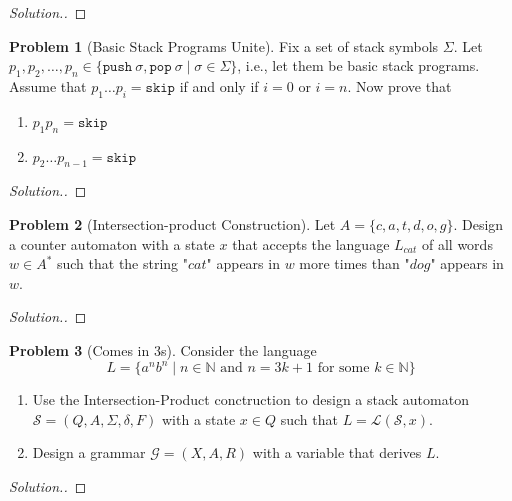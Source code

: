 \documentclass[11pt]{article}
\theoremstyle{theorem} %
\theoremstyle{definition} %
\newtheorem{problem}                    {{\color{BurntOrange}Problem}}
\theoremstyle{remark} %
\begin{document}
\begin{proof}
    [Solution.]
\end{proof}

\begin{problem}
    [Basic Stack Programs Unite]
    Fix a set of stack symbols \(\Sigma\).
    Let \(p_1,p_2,\dots, p_n \in \{\mathtt{push}~\sigma, \mathtt{pop}~\sigma \mid \sigma \in \Sigma\}\), i.e., let them be basic stack programs.
    Assume that \(p_1\dots p_i = \mathtt{skip}\) if and only if \(i = 0\) or \(i = n\). 
    Now prove that 
    \begin{enumerate}
        \item \(p_1 p_n = \mathtt{skip}\)
        \item \(p_2\dots p_{n-1} = \mathtt{skip}\)
    \end{enumerate}
\end{problem}

\begin{proof}
    [Solution.]
\end{proof}

\begin{problem}
    [Intersection-product Construction]
    Let \(A = \{c, a, t, d, o, g\}\). 
    Design a counter automaton with a state \(x\) that accepts the language \(L_{cat}\) of all words \(w \in A^*\) such that the string "\(cat\)" appears in \(w\) more times than "\(dog\)" appears in \(w\).
\end{problem}

\begin{proof}
    [Solution.]
\end{proof}

\begin{problem}
    [Comes in 3s]
    Consider the language 
    \[
        L = \{a^nb^n \mid n \in \mathbb{N} \text{ and } n = 3k + 1 \text{ for some \(k \in \mathbb N\)}\}
    \]
    \begin{enumerate}
        \item Use the Intersection-Product conctruction to design a stack automaton \(\mathcal S = (Q, A, \Sigma, \delta, F)\) with a state \(x\in Q\) such that \(L = \mathcal L(\mathcal S, x)\).
        \item Design a grammar \(\mathcal G = (X, A, R)\) with a variable that derives \(L\).
    \end{enumerate}
\end{problem}

\begin{proof}
    [Solution.]
\end{proof}
\end{document}
